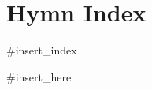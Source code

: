\documentclass{article}
\begin{document}
\section*{Hymn Index}
\begin{itemize}[noitemsep]

#insert_index

\end{itemize}
\pagebreak

\songsection{}

\begin{songs}{}

#insert_here

\end{songs}
\end{document}
